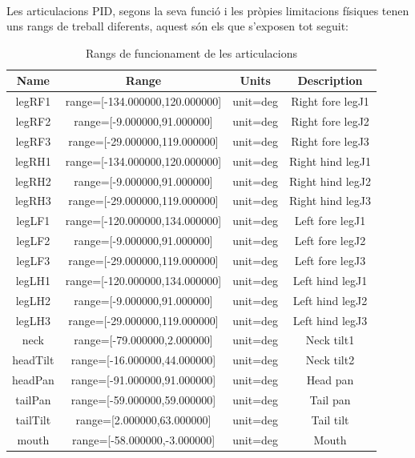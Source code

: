 \documentclass[12pt,a4paper,final,twoside]{article}
\begin{document}
\paragraph{}Les articulacions PID, segons la seva funció i les pròpies limitacions físiques tenen uns rangs de treball diferents, aquest són els que s'exposen tot seguit: 

\begin{table}[h]
\begin{center}
\begin{tabular}{| c | c | c | c |}
\hline
Name & Range & Units & Description\\ \hline \hline
legRF1    &    range=[-134.000000,120.000000]  & unit=deg & Right fore legJ1\\
legRF2    &    range=[-9.000000,91.000000]     & unit=deg & Right fore legJ2\\
legRF3    &    range=[-29.000000,119.000000]   & unit=deg & Right fore legJ3\\
legRH1    &    range=[-134.000000,120.000000]  & unit=deg & Right hind legJ1\\
legRH2    &    range=[-9.000000,91.000000]     & unit=deg & Right hind legJ2\\
legRH3    &    range=[-29.000000,119.000000]   & unit=deg & Right hind legJ3\\
legLF1    &    range=[-120.000000,134.000000]  & unit=deg & Left fore legJ1\\
legLF2    &    range=[-9.000000,91.000000]     & unit=deg & Left fore legJ2\\
legLF3    &    range=[-29.000000,119.000000]   & unit=deg & Left fore legJ3\\
legLH1    &    range=[-120.000000,134.000000]  & unit=deg & Left hind legJ1\\
legLH2    &    range=[-9.000000,91.000000]     & unit=deg & Left hind legJ2\\
legLH3    &    range=[-29.000000,119.000000]   & unit=deg & Left hind legJ3\\
neck      &    range=[-79.000000,2.000000]     & unit=deg & Neck tilt1\\
headTilt  &    range=[-16.000000,44.000000]    & unit=deg & Neck tilt2\\
headPan   &    range=[-91.000000,91.000000]    & unit=deg & Head pan\\
tailPan   &    range=[-59.000000,59.000000]    & unit=deg & Tail pan\\
tailTilt  &    range=[2.000000,63.000000]      & unit=deg & Tail tilt\\
mouth     &    range=[-58.000000,-3.000000]    & unit=deg & Mouth\\
\hline
\end{tabular}
\end{center}
\caption{Rangs de funcionament de les articulacions \cite{Urbi_Docs}}
\end{table}
\end{document}
